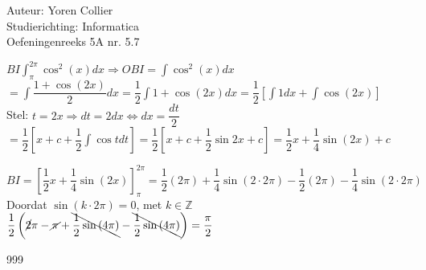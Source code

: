 \documentclass[a4paper]{article}
\newcommand{\asa}{\Leftrightarrow} %
\newcommand{\adR}{\Rightarrow} %
\newcommand{\Lh}{\left(} %
\newcommand{\Rh}{\right)}
\newcommand{\Lv}{\left[} %
\newcommand{\Rv}{\right]}
\newcommand{\schrap}{\cancel}
\newcommand{\schrapb}{\bcancel} %
\newcommand{\intgrl}{\displaystyle\int} %
\begin{document}
\noindent \large Auteur: Yoren Collier \\
\noindent \large Studierichting: Informatica\\
\noindent \large Oefeningenreeks 5A nr. 5.7\\

\medskip

\normalsize

$ BI \intgrl_\pi^{2\pi} \cos^2 \Lh x \Rh dx \adR OBI = \intgrl \cos^2 \Lh x \Rh dx$\\

$= \intgrl \dfrac{1 + \cos \Lh 2x \Rh}{2} dx = \dfrac{1}{2} \intgrl 1 + \cos \Lh 2x \Rh dx = \dfrac{1}{2} \Lv \intgrl1dx + \intgrl\cos \Lh 2x \Rh \Rv $\\

Stel: $t = 2x \adR dt = 2dx \asa dx = \dfrac{dt}{2}$\\

$= \dfrac{1}{2} \Lv x +c + \dfrac{1}{2} \intgrl \cos t dt \Rv = \dfrac{1}{2} \Lv x +c + \dfrac{1}{2} \sin 2x +c \Rv = \dfrac{1}{2}x +\dfrac{1}{4}\sin \Lh 2x \Rh +c$

$BI = \Lv \dfrac{1}{2}x +\dfrac{1}{4}\sin \Lh 2x \Rh \Rv_\pi^{2\pi} = \dfrac{1}{2} \Lh 2\pi \Rh + \dfrac{1}{4} \sin \Lh 2 \cdot 2\pi \Rh - \dfrac{1}{2} \Lh 2\pi \Rh - \dfrac{1}{4} \sin \Lh 2 \cdot 2\pi \Rh$\\

Doordat $\sin \Lh k \cdot 2\pi \Rh = 0$, met $k \in \mathbb{Z}$\\

$\dfrac{1}{2} \Lh \schrap{2}\pi - \schrap{\pi} +\schrapb{\dfrac{1}{2} \sin \Lh 4\pi \Rh} -\schrapb{\dfrac{1}{2} \sin \Lh 4\pi \Rh} \Rh = \dfrac{\pi}{2}$\\

\begin{thebibliography}{999}
\end{thebibliography}
\end{document}
